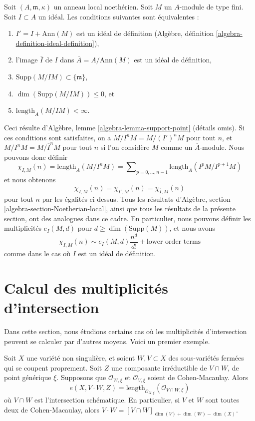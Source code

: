 \begin{remark}
\label{remark-trivial-generalization}
Soit $(A, \mathfrak m, \kappa)$ un anneau local noethérien.
Soit $M$ un $A$-module de type fini. Soit $I \subset A$ un idéal.
Les conditions suivantes sont équivalentes :
\begin{enumerate}
\item $I' = I + \text{Ann}(M)$ est un idéal de définition
(Algèbre, définition \ref{algebra-definition-ideal-definition}),
\item l'image $\overline{I}$ de $I$ dans $\overline{A} = A/\text{Ann}(M)$
est un idéal de définition,
\item $\text{Supp}(M/IM) \subset \{\mathfrak m\}$,
\item $\dim(\text{Supp}(M/IM)) \leq 0$, et
\item $\text{length}_A(M/IM) < \infty$.
\end{enumerate}
Ceci résulte d'Algèbre, lemme \ref{algebra-lemma-support-point}
(détails omis). Si ces conditions sont satisfaites, on a $M/I^nM = M/(I')^nM$
pour tout $n$, et $M/I^nM = M/\overline{I}^nM$ pour tout $n$
si l'on considère $M$ comme un $\overline{A}$-module.
Nous pouvons donc définir
$$
\chi_{I, M}(n) = \text{length}_A(M/I^nM) =
\sum\nolimits_{p = 0, \ldots, n - 1} \text{length}_A(I^pM/I^{p + 1}M)
$$
et nous obtenons
$$
\chi_{I, M}(n) = \chi_{I', M}(n) = \chi_{\overline{I}, M}(n)
$$
pour tout $n$ par les égalités ci-dessus.
Tous les résultats d'Algèbre, section \ref{algebra-section-Noetherian-local},
ainsi que tous les résultats de la présente section, ont des analogues dans ce cadre.
En particulier, nous pouvons définir les multiplicités $e_I(M, d)$ pour
$d \geq \dim(\text{Supp}(M))$, et nous avons
$$
\chi_{I, M}(n) \sim e_I(M, d) \frac{n^d}{d!} + \text{lower order terms}
$$
comme dans le cas où $I$ est un idéal de définition.
\end{remark}



\section{Calcul des multiplicités d'intersection}
\label{section-computing-intersection-multiplicities}

\noindent
Dans cette section, nous étudions certains cas où les multiplicités d'intersection
peuvent se calculer par d'autres moyens. Voici un premier exemple.

\begin{lemma}
\label{lemma-intersection-multiplicity-CM}
Soit $X$ une variété non singulière, et soient $W, V \subset X$ des
sous-variétés fermées qui se coupent proprement. Soit $Z$ une composante irréductible
de $V \cap W$, de point générique $\xi$. Supposons que $\mathcal{O}_{W, \xi}$
et $\mathcal{O}_{V, \xi}$ soient de Cohen-Macaulay. Alors
$$
e(X, V \cdot W, Z) =
\text{length}_{\mathcal{O}_{X, \xi}}(\mathcal{O}_{V \cap W, \xi})
$$
où $V \cap W$ est l'intersection schématique.
En particulier, si $V$ et $W$ sont toutes deux de Cohen-Macaulay, alors
$V \cdot W = [V \cap W]_{\dim(V) + \dim(W) - \dim(X)}$.
\end{lemma}

